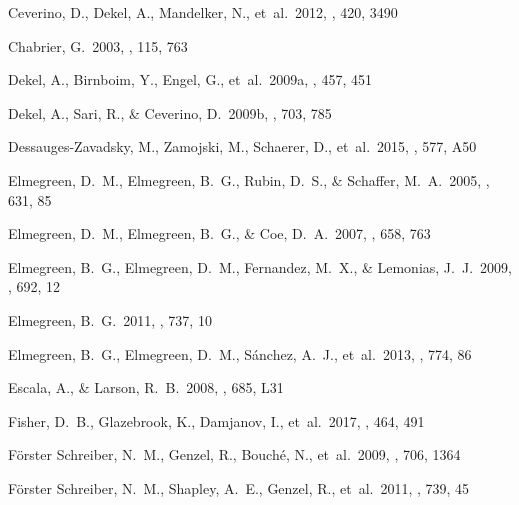 \documentclass[twocolumn]{aastex61}
\begin{document}
\begin{thebibliography}{}
Ceverino, D., Dekel, A., Mandelker, N., et~al.\ 2012, \mnras, 420, 3490

Chabrier, G.\ 2003, \pasp, 115, 763


Dekel, A., Birnboim, Y.,  Engel, G., et~al.\ 2009a, \nat, 457, 451

Dekel, A., Sari, R., \& Ceverino, D.\ 2009b, \apj, 703, 785


Dessauges-Zavadsky, M., Zamojski, M., Schaerer, D., et~al.\ 2015, \aap, 577, A50

Elmegreen, D.~M., Elmegreen, B.~G., Rubin, D.~S., \& Schaffer, M.~A.\ 2005, \apj, 631, 85

Elmegreen, D.~M., Elmegreen, B.~G., \& Coe, D.~A.\ 2007, \apj, 658, 763

Elmegreen, B.~G., Elmegreen, D.~M., Fernandez, M.~X., \& Lemonias, J.~J.\ 2009, \apj, 692, 12

Elmegreen, B.~G.\ 2011, \apj,  737, 10

Elmegreen, B.~G., Elmegreen, D.~M., S\'anchez, A.~J., et~al.\ 2013, \apj, 774, 86

Escala, A., \& Larson, R.~B.\ 2008, \apjl, 685, L31


Fisher, D.~B., Glazebrook, K., Damjanov, I., et~al.\ 2017, \mnras, 464, 491

F\"orster Schreiber, N.~M., Genzel, R., Bouch\'e, N., et~al.\ 2009, \apj, 706, 1364

F\"orster Schreiber, N.~M., Shapley, A.~E., Genzel, R., et~al.\ 2011, \apj, 739, 45


\end{thebibliography}
\end{document}

